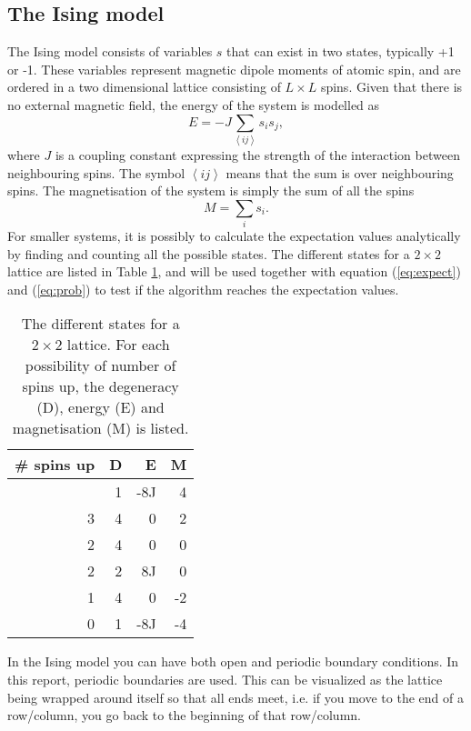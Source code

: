 \subsection{The Ising model}
The Ising model consists of variables $s$ that can exist in two states, typically +1 or -1. These variables represent magnetic dipole moments of atomic spin, and are ordered in a two dimensional lattice consisting of $L\times L$ spins. Given that there is no external magnetic field, the energy of the system is modelled as
\begin{equation}
E = -J\sum_{\left\langle ij\right\rangle } s_is_j,
\end{equation} 
where $J$ is a coupling constant expressing the strength of the interaction between neighbouring spins. The symbol $\left\langle ij\right\rangle$ means that the sum is over neighbouring spins. The magnetisation of the system is simply the sum of all the spins 
\begin{equation}
M = \sum_i s_i.
\end{equation}
For smaller systems, it is possibly to calculate the expectation values analytically by finding and counting all the possible states. The different states for a $2\times 2$ lattice are listed in Table \ref{tab:L2 values}, and will be used together with equation (\ref{eq:expect}) and (\ref{eq:prob}) to test if the algorithm reaches the expectation values.
\begin{table}[htbp]
	\centering
	\begin{tabular}{rrrr}
		\# spins up & D & E & M \\
		\hline
		\addlinespace[0.1cm]
		4                   & 1          & -8J    & 4             \\
		3                   & 4          & 0      & 2             \\
		2                   & 4          & 0      & 0             \\
		2                   & 2          & 8J     & 0             \\
		1                   & 4          & 0      & -2            \\
		0                   & 1          & -8J    & -4           
	\end{tabular}
	\caption{The different states for a $2\times 2$ lattice. For each possibility of number of spins up, the degeneracy (D), energy (E) and magnetisation (M) is listed.}
	\label{tab:L2 values}
\end{table}

In the Ising model you can have both open and periodic boundary conditions. In this report, periodic boundaries are used. This can be visualized as the lattice being wrapped around itself so that all ends meet, i.e. if you move to the end of a row/column, you go back to the beginning of that row/column. 

